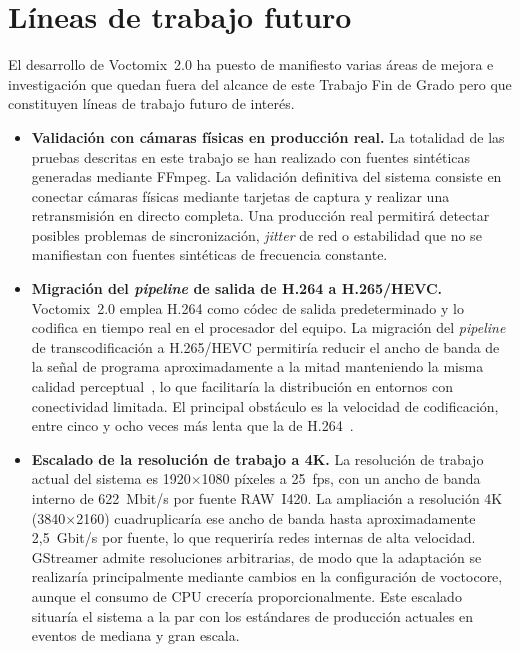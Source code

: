 \section{Líneas de trabajo futuro}
\label{sec:lineas_futuras}

El desarrollo de Voctomix~2.0 ha puesto de manifiesto varias áreas de mejora e
investigación que quedan fuera del alcance de este Trabajo Fin de Grado pero que
constituyen líneas de trabajo futuro de interés.

\begin{itemize}

  \item \textbf{Validación con cámaras físicas en producción real.}
  La totalidad de las pruebas descritas en este trabajo se han realizado con fuentes
  sintéticas generadas mediante FFmpeg. La validación definitiva del sistema consiste
  en conectar cámaras físicas mediante tarjetas de captura y realizar una
  retransmisión en directo completa. Una producción real permitirá detectar
  posibles problemas de sincronización, \textit{jitter} de red o estabilidad que no
  se manifiestan con fuentes sintéticas de frecuencia constante.

  \item \textbf{Migración del \textit{pipeline} de salida de H.264 a H.265/HEVC.}
  Voctomix~2.0 emplea H.264 como códec de salida predeterminado y lo codifica en
  tiempo real en el procesador del equipo. La migración del \textit{pipeline} de
  transcodificación a H.265/HEVC permitiría reducir el ancho de banda de
  la señal de programa aproximadamente a la mitad manteniendo la misma calidad
  perceptual~\cite{itu_h265}, lo que facilitaría la distribución en entornos con
  conectividad limitada. El principal obstáculo es la velocidad de codificación,
  entre cinco y ocho veces más lenta que la de H.264~\cite{itu_h265}.

  \item \textbf{Escalado de la resolución de trabajo a 4K.}
  La resolución de trabajo actual del sistema es 1920$\times$1080 píxeles a 25~fps,
  con un ancho de banda interno de 622~Mbit/s por fuente RAW~I420. La ampliación a
  resolución 4K (3840$\times$2160) cuadruplicaría ese ancho de banda hasta
  aproximadamente 2{,}5~Gbit/s por fuente, lo que requeriría redes internas de alta
  velocidad. GStreamer admite resoluciones arbitrarias, de modo que la adaptación se
  realizaría principalmente mediante cambios en la configuración de voctocore, aunque
  el consumo de CPU crecería proporcionalmente. Este escalado situaría el sistema a
  la par con los estándares de producción actuales en eventos de mediana y gran escala.


\end{itemize}
